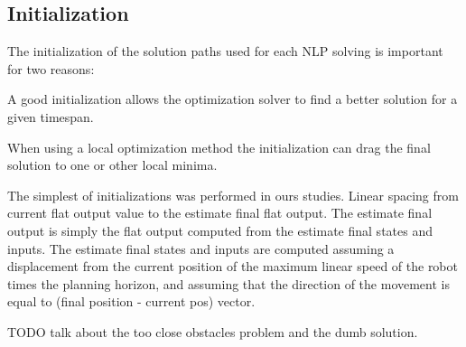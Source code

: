 \documentclass[eprint]{actapoly}
\begin{document}


\subsection{Initialization}


The initialization of the solution paths used for each NLP solving is important for two reasons:
\begin{itmeze}
 \item
A good initialization allows the
optimization solver to find a better solution for a given timespan.
 \item
When using a local optimization method the initialization
can drag the final solution to one or other local minima.
\end{itmeze}

The simplest of initializations was performed in ours studies. Linear spacing from current flat output value to the estimate final flat output.
The estimate final output is simply the flat output computed from the estimate final states and inputs. The estimate final states and inputs
are computed assuming a displacement from the current position of the maximum linear speed
of the robot times the planning horizon, and assuming that the direction of the movement is equal to (final position - current pos) vector.

TODO talk about the too close obstacles problem and the dumb solution.
\end{document}
